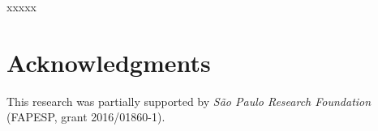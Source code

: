 \documentclass[preprint,authoryear]{elsarticle}
\begin{document}
xxxxx

\section*{Acknowledgments}

This research was partially supported by \textit{São Paulo Research Foundation} (FAPESP, grant 2016/01860-1).




\end{document}
